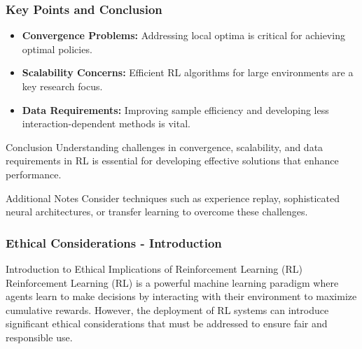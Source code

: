 \documentclass[aspectratio=169]{beamer}
\begin{document}
\begin{frame}[fragile]
    \frametitle{Key Points and Conclusion}
    \begin{itemize}
        \item \textbf{Convergence Problems:} Addressing local optima is critical for achieving optimal policies.
        \item \textbf{Scalability Concerns:} Efficient RL algorithms for large environments are a key research focus.
        \item \textbf{Data Requirements:} Improving sample efficiency and developing less interaction-dependent methods is vital.
    \end{itemize}
    
    \begin{block}{Conclusion}
        Understanding challenges in convergence, scalability, and data requirements in RL is essential for developing effective solutions that enhance performance.
    \end{block}
    
    \begin{block}{Additional Notes}
        Consider techniques such as experience replay, sophisticated neural architectures, or transfer learning to overcome these challenges.
    \end{block}
\end{frame}

\begin{frame}[fragile]
    \frametitle{Ethical Considerations - Introduction}
    \begin{block}{Introduction to Ethical Implications of Reinforcement Learning (RL)}
        Reinforcement Learning (RL) is a powerful machine learning paradigm 
        where agents learn to make decisions by interacting with their environment 
        to maximize cumulative rewards. However, the deployment of RL systems can introduce 
        significant ethical considerations that must be addressed to ensure 
        fair and responsible use.
    \end{block}
\end{frame}
\end{document}

